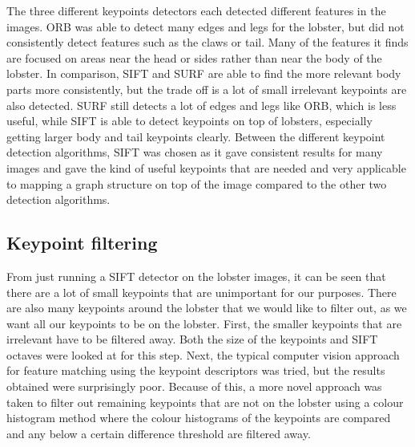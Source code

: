 The three different keypoints detectors each detected different features in the images. ORB was able to detect many edges and legs for the lobster, but did not consistently detect features such as the claws or tail. Many of the features it finds are focused on areas near the head or sides rather than near the body of the lobster. In comparison, SIFT and SURF are able to find the more relevant body parts more consistently, but the trade off is a lot of small irrelevant keypoints are also detected. SURF still detects a lot of edges and legs like ORB, which is less useful, while SIFT is able to detect keypoints on top of lobsters, especially getting larger body and tail keypoints clearly. Between the different keypoint detection algorithms, SIFT was chosen as it gave consistent results for many images and gave the kind of useful keypoints that are needed and very applicable to mapping a graph structure on top of the image compared to the other two detection algorithms.


\subsection{Keypoint filtering}\label{sec:kp-filtering}
From just running a SIFT detector on the lobster images, it can be seen that there are a lot of small keypoints that are unimportant for our purposes. There are also many keypoints around the lobster that we would like to filter out, as we want all our keypoints to be on the lobster. First, the smaller keypoints that are irrelevant have to be filtered away. Both the size of the keypoints and SIFT octaves were looked at for this step. Next, the typical computer vision approach for feature matching using the keypoint descriptors \cite{sift} was tried, but the results obtained were surprisingly poor. Because of this, a more novel approach was taken to filter out remaining keypoints that are not on the lobster using a colour histogram method where the colour histograms of the keypoints are compared and any below a certain difference threshold are filtered away.

